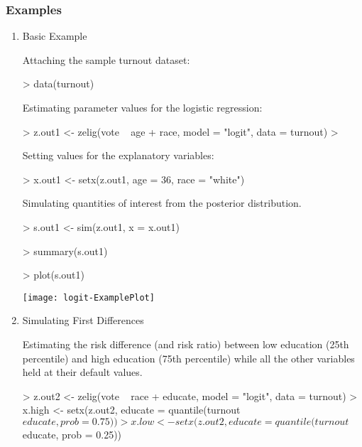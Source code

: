 \subsubsection{Examples}
\begin{enumerate}
\item {Basic Example}
 
Attaching the sample turnout dataset:
\begin{Schunk}
\begin{Sinput}
>  data(turnout)
\end{Sinput}
\end{Schunk}
Estimating parameter values for the logistic regression:
\begin{Schunk}
\begin{Sinput}
>  z.out1 <- zelig(vote ~ age + race,  model = "logit", data = turnout) 
> 
\end{Sinput}
\end{Schunk}
Setting values for the explanatory variables:
\begin{Schunk}
\begin{Sinput}
>  x.out1 <- setx(z.out1, age = 36, race = "white")
\end{Sinput}
\end{Schunk}
Simulating quantities of interest from the posterior distribution.
\begin{Schunk}
\begin{Sinput}
>  s.out1 <- sim(z.out1, x = x.out1)
\end{Sinput}
\end{Schunk}
\begin{Schunk}
\begin{Sinput}
>  summary(s.out1)
\end{Sinput}
\end{Schunk}
\begin{center}
\begin{Schunk}
\begin{Sinput}
>  plot(s.out1)
\end{Sinput}
\end{Schunk}
\texttt{[image: logit-ExamplePlot]}
\end{center}

\item {Simulating First Differences}

Estimating the risk difference (and risk ratio) between low education
(25th percentile) and high education (75th percentile) while all the
other variables held at their default values.
\begin{Schunk}
\begin{Sinput}
>  z.out2 <- zelig(vote ~ race + educate, model = "logit", data = turnout)
>  x.high <- setx(z.out2, educate = quantile(turnout$educate, prob = 0.75))
>  x.low <- setx(z.out2, educate = quantile(turnout$educate, prob = 0.25))
\end{Sinput}
\end{Schunk}


\end{enumerate}
